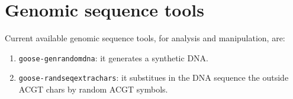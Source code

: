 \chapter{Genomic sequence tools}
\label{gst}

Current available genomic sequence tools, for analysis and manipulation, are:
\begin{enumerate}
\item \texttt{goose-genrandomdna}: it generates a synthetic DNA.
\item \texttt{goose-randseqextrachars}: it substitues in the DNA sequence the outside ACGT chars by random ACGT symbols.
\end{enumerate}



%

%
%